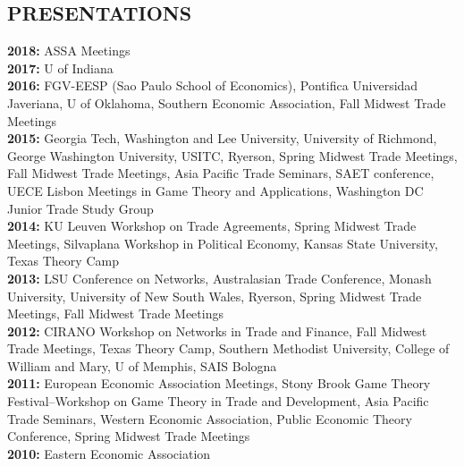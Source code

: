 \documentclass[11pt]{res}
\begin{document}
\begin{resume}
\section{PRESENTATIONS}\vspace{1.5mm}
{\bf 2018:} ASSA Meetings \vspace{1.5mm}\\
{\bf 2017:} U of Indiana \vspace{1.5mm}\\
{\bf 2016:} FGV-EESP (Sao Paulo School of Economics), Pontifica Universidad Javeriana, U of Oklahoma, Southern Economic Association, Fall Midwest Trade Meetings\vspace{1.5mm}\\



\phantom{.}\vspace{.05cm}
{\bf 2015:} Georgia Tech, Washington and Lee University, University of Richmond, George Washington University, USITC, Ryerson, Spring Midwest Trade Meetings, Fall Midwest Trade Meetings, Asia Pacific Trade Seminars, SAET conference, UECE Lisbon Meetings in Game Theory and Applications, Washington DC Junior Trade Study Group\vspace{1.5mm}\\
{\bf 2014:} KU Leuven Workshop on Trade Agreements, Spring Midwest Trade Meetings, Silvaplana Workshop in Political Economy, Kansas State University, Texas Theory Camp\vspace{1.5mm}\\
{\bf 2013:} LSU Conference on Networks, Australasian Trade Conference, Monash University, University of New South Wales, Ryerson, Spring Midwest Trade Meetings, Fall Midwest Trade Meetings \vspace{1.5mm}\\
{\bf 2012:}  CIRANO Workshop on Networks in Trade and Finance, Fall Midwest Trade Meetings, Texas Theory Camp, Southern Methodist University, College of William and Mary, U of Memphis, SAIS Bologna\vspace{1.5mm}\\
{\bf 2011:} European Economic Association Meetings, Stony Brook Game Theory Festival--Workshop on Game Theory in Trade and Development, Asia Pacific Trade Seminars, Western Economic Association, Public Economic Theory Conference, Spring Midwest Trade Meetings\vspace{1.5mm}\\
{\bf 2010:} Eastern Economic Association \vspace{1.5mm}\\


\end{resume}
\end{document}
